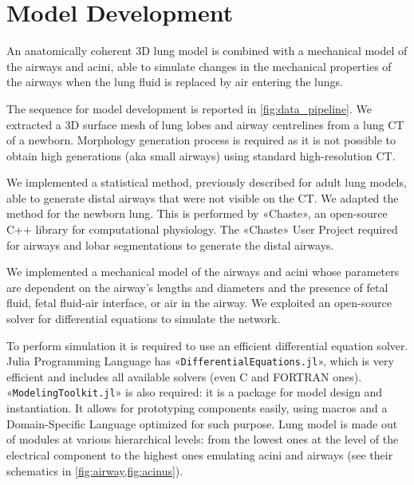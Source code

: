 \section{Model Development}
\label{sec:model_development}




An anatomically coherent 3D lung model is combined with a mechanical
model of the airways and acini, able to simulate changes in the
mechanical properties of the airways when the lung fluid is replaced
by air entering the lungs.

The sequence for model development is reported in
\cref{fig:data_pipeline}. We extracted a 3D surface mesh of lung lobes
and airway centrelines from a lung CT of a newborn.  Morphology
generation process is required as it is not possible to obtain high
generations (aka small airways) using standard high-resolution CT.

We implemented a statistical method, previously described for adult
lung models, able to generate distal airways that were not visible on
the CT\cite{bordas2015,tawhai2000}. We adapted the method for the
newborn lung.  This is performed by «Chaste», an open-source C++
library for computational physiology.  The «Chaste» User Project
required for airways and lobar segmentations to generate the distal
airways.

We implemented a mechanical model of the airways and acini whose
parameters are dependent on the airway's lengths and diameters and the
presence of fetal fluid, fetal fluid-air interface, or air in the
airway. We exploited an open-source solver for differential equations
to simulate the network.

To perform simulation it is required to use an efficient differential
equation solver.  Julia Programming Language\cite{juliadocs2024} has
«\texttt{DifferentialEquations.jl}»\cite{rackauckas2017}, which is
very efficient and includes all available solvers (even C and FORTRAN
ones)\cite{diffeqdocs2024,rackauckas2017}.
«\texttt{ModelingToolkit.jl}»\cite{ma2021} is also required: it is a
package for model design and instantiation.  It allows for prototyping
components easily, using macros and a Domain-Specific Language
optimized for such purpose.  Lung model is made out of modules at
various hierarchical levels: from the lowest ones at the level of the
electrical component to the highest ones emulating acini and airways
(see their schematics in \cref{fig:airway,fig:acinus}).

